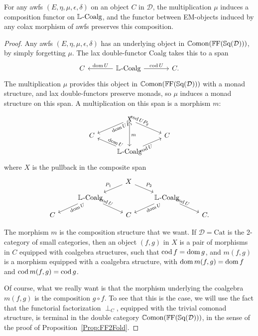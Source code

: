\begin{corollary}
	For any awfs $(E,\eta,\mu,\epsilon,\delta)$ on an object $C$ in $\mathcal{D}$, the multiplication $\mu$ induces a composition functor on $\mathbb{L}_{}\text{-}\mathrm{Coalg}$, and the functor between EM-objects induced by any colax morphism of awfs preserves this composition.
\end{corollary}
\begin{proof}
	Any awfs $(E,\eta,\mu,\epsilon,\delta)$ has an underlying object in $\mathbb{C}\mathrm{omon}(\mathbb{F}\mathrm{F}(\mathbb{S}\mathrm{q}(\mathcal{D})))$, by simply forgetting $\mu$. The lax double-functor $\mathrm{Coalg}$ takes this to a span
	\[
	\begin{tikzcd}[column sep=large]
		C & \LCoalg \lar[swap]{\dom U} \rar{\cod U} & C.
	\end{tikzcd}
	\]
	The multiplication $\mu$ provides this object in $\mathbb{C}\mathrm{omon}(\mathbb{F}\mathrm{F}(\mathbb{S}\mathrm{q}(\mathcal{D})))$ with a monad structure, and lax double-functors preserve monads, so $\mu$ induces a monad structure on this span. A multiplication on this span is a morphism $m$:
	\[
	\begin{tikzcd}[row sep=small,sloped,pos=.1]
		{} & X \dlar[swap]{\dom UP_1} \drar{\cod UP_2} \ar{dd}[sloped=false,pos=.5]{m} & \\
		C && C \\
		& \LCoalg \ular{\dom U} \urar[swap]{\cod U}
	\end{tikzcd}
	\]
	where $X$ is the pullback in the composite span
	\[
	\begin{tikzcd}[row sep=small]
		{} && X \dlar[swap]{P_1} \drar{P_2} && \\
		& \LCoalg \dlar[swap,sloped,pos=.1]{\dom U} \drar[sloped,pos=.1]{\cod U}
			&& \LCoalg \dlar[swap,sloped,pos=.1]{\dom U} \drar[sloped,pos=.1]{\cod U} & \\
		C && C && C.
	\end{tikzcd}
	\]

	The morphism $m$ is the composition structure that we want. If $\mathcal{D}=\mathrm{Cat}$ is the 2-category of small categories, then an object $(f,g)$ in $X$ is a pair of morphisms in $C$ equipped with coalgebra structures, such that $\operatorname{cod} f = \operatorname{dom} g$, and $m(f,g)$ is a morphism equipped with a coalgebra structure, with $\operatorname{dom} m(f,g)=\operatorname{dom} f$ and $\operatorname{cod} m(f,g)=\operatorname{cod} g$.

	Of course, what we really want is that the morphism underlying the coalgebra $m(f,g)$ is the composition $g\circ f$. To see that this is the case, we will use the fact that the functorial factorization $\perp_C$, equipped with the trivial comonad structure, is terminal in the double category $\mathbb{C}\mathrm{omon}(\mathbb{F}\mathrm{F}(\mathbb{S}\mathrm{q}(\mathcal{D})))$, in the sense of the proof of Proposition~\ref{Prop:FF2Fold}.


\end{proof}
